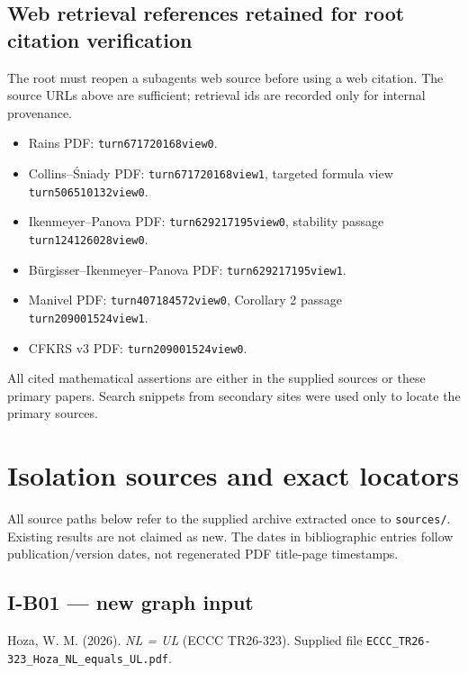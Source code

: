 \documentclass[11pt,a4paper]{article}
\providecommand{\tightlist}{\setlength{\itemsep}{0pt}\setlength{\parskip}{0pt}}
\theoremstyle{definition}\newtheorem{definition}{Definition}
\begin{document}
\subsection{Web retrieval references retained for root citation
verification}\label{web-retrieval-references-retained-for-root-citation-verification}

The root must reopen a subagent\textquotesingle s web source before
using a web citation. The source URLs above are sufficient; retrieval
ids are recorded only for internal provenance.

\begin{itemize}
\tightlist
\item
  Rains PDF: \texttt{turn671720168view0}.
\item
  Collins--Śniady PDF: \texttt{turn671720168view1}, targeted formula
  view \texttt{turn506510132view0}.
\item
  Ikenmeyer--Panova PDF: \texttt{turn629217195view0}, stability passage
  \texttt{turn124126028view0}.
\item
  Bürgisser--Ikenmeyer--Panova PDF: \texttt{turn629217195view1}.
\item
  Manivel PDF: \texttt{turn407184572view0}, Corollary 2 passage
  \texttt{turn209001524view1}.
\item
  CFKRS v3 PDF: \texttt{turn209001524view0}.
\end{itemize}

All cited mathematical assertions are either in the supplied sources or
these primary papers. Search snippets from secondary sites were used
only to locate the primary sources.
\section{Isolation sources and exact
locators}\label{isolation-sources-and-exact-locators}

All source paths below refer to the supplied archive extracted once to
\texttt{sources/}. Existing results are not claimed as new. The dates in
bibliographic entries follow publication/version dates, not regenerated
PDF title-page timestamps.

\subsection{I-B01 --- new graph input}\label{i-b01--new-graph-input}

Hoza, W. M. (2026). \emph{NL = UL} (ECCC TR26-323). Supplied file
\texttt{ECCC\_TR26-323\_Hoza\_NL\_equals\_UL.pdf}.
\end{document}
